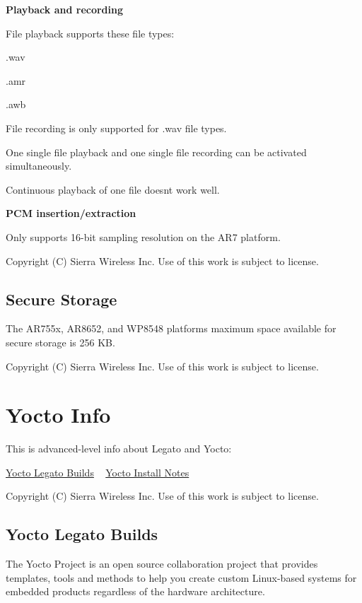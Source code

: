 {\bfseries Playback and recording}

File playback supports these file types\+:
\begin{DoxyItemize}
\item .wav
\item .amr
\item .awb
\end{DoxyItemize}

File recording is only supported for {\bfseries }.wav file types.

One single file playback and one single file recording can be activated simultaneously.

Continuous playback of one file doesn\textquotesingle{}t work well.

{\bfseries P\+C\+M insertion/extraction}

Only supports 16-\/bit sampling resolution on the A\+R7 platform.





Copyright (C) Sierra Wireless Inc. Use of this work is subject to license. \hypertarget{platformConstraintsSecStorage}{}\subsection{Secure Storage}\label{platformConstraintsSecStorage}
The A\+R755x, A\+R8652, and W\+P8548 platforms maximum space available for secure storage is 256 K\+B.





Copyright (C) Sierra Wireless Inc. Use of this work is subject to license. \hypertarget{yoctoMain}{}\section{Yocto Info}\label{yoctoMain}
This is advanced-\/level info about Legato and Yocto\+:

\hyperlink{yoctoLegato}{Yocto Legato Builds} ~\newline
 \hyperlink{yoctoInstallNotes}{Yocto Install Notes} ~\newline






Copyright (C) Sierra Wireless Inc. Use of this work is subject to license. \hypertarget{yoctoLegato}{}\subsection{Yocto Legato Builds}\label{yoctoLegato}
The Yocto Project is an open source collaboration project that provides templates, tools and methods to help you create custom Linux-\/based systems for embedded products regardless of the hardware architecture.

